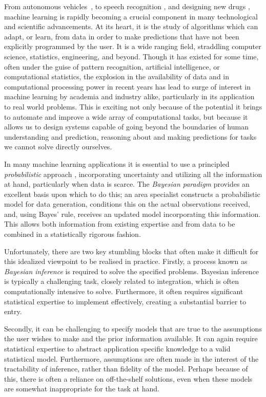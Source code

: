 
From autonomous vehicles~\citep{lefevre2014survey}, to speech recognition \citep{jurafsky2014speech},
and designing new drugs \citep{burbidge2001drug}, machine learning is rapidly becoming a 
crucial component in many technological and scientific advancements.  
At its heart, it is the study of algorithms which can adapt, or learn, from data in order
to make predictions that have not been explicitly programmed by the user.  It is a wide ranging field,
straddling computer science, statistics, engineering, and beyond. Though it has existed for some
time, often under the guise of pattern recognition, artificial intelligence, or computational 
statistics, the explosion in the availability of data and in computational processing power in recent
years has lead to surge of interest in machine learning by academia and industry alike, particularly 
in its application to real world problems.  This is exciting not only because of the potential it brings
to automate and improve a wide array of computational tasks, but because it allows us to design 
systems capable of going beyond the boundaries of human understanding and prediction, reasoning
about and making predictions for tasks we cannot solve directly ourselves.

In many machine learning applications it is essential to use a principled \emph{probabilistic} 
approach \cite{ghahramani2015probabilistic}, incorporating uncertainty and utilizing all the information at hand, 
particularly when data is scarce.  The \emph{Bayesian paradigm} provides an excellent basis upon which to do this; an area 
specialist constructs a probabilistic model for data generation, conditions this on the actual observations received, 
and, using Bayes' rule, receives an updated model incorporating this information.  This
allows both information from existing expertise and from data to be combined in a statistically
rigorous fashion.

Unfortunately, there are two key stumbling blocks that often make it difficult for this idealized
viewpoint to be realised in practice.  Firstly, a process known as \emph{Bayesian inference} is
required to solve the specified problems.  Bayesian inference is typically a challenging task, closely 
related to integration, which is often computationally intensive to solve.  Furthermore, it often
requires significant statistical expertise to implement effectively, creating a substantial barrier to
entry.  

Secondly, it can be challenging to specify models that are true to the assumptions the user
wishes to make and the prior information available.  It can again require statistical expertise to abstract
application specific knowledge to a valid statistical model.  Furthermore, assumptions are often made in the interest
of the tractability of inference, rather than fidelity of the model.  Perhaps because of this, there is often
a reliance on off-the-shelf solutions, even when these models are somewhat inappropriate for the task
at hand.

